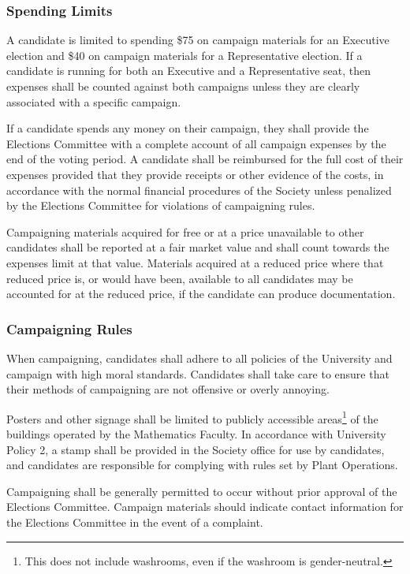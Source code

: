 \subsubsection{Spending Limits}
A candidate is limited to spending \$75 on campaign materials for an Executive election and \$40 on campaign materials for a Representative election.
If a candidate is running for both an Executive and a Representative seat, then expenses shall be counted against both campaigns unless they are clearly associated with a specific campaign.

If a candidate spends any money on their campaign, they shall provide the Elections Committee with a complete account of all campaign expenses by the end of the voting period.
A candidate shall be reimbursed for the full cost of their expenses provided that they provide receipts or other evidence of the costs, in accordance with the normal financial procedures of the Society unless penalized by the Elections Committee for violations of campaigning rules.

Campaigning materials acquired for free or at a price unavailable to other candidates shall be reported at a fair market value and shall count towards the expenses limit at that value.
Materials acquired at a reduced price where that reduced price is, or would have been, available to all candidates may be accounted for at the reduced price, if the candidate can produce documentation.

\subsubsection{Campaigning Rules}
When campaigning, candidates shall adhere to all policies of the University and campaign with high moral standards.
Candidates shall take care to ensure that their methods of campaigning are not offensive or overly annoying.

Posters and other signage shall be limited to publicly accessible areas\footnote{This does not include washrooms, even if the washroom is gender-neutral.} of the buildings operated by the Mathematics Faculty.
In accordance with University Policy 2, a stamp shall be provided in the Society office for use by candidates, and candidates are responsible for complying with rules set by Plant Operations.

Campaigning shall be generally permitted to occur without prior approval of the Elections Committee.
Campaign materials should indicate contact information for the Elections Committee in the event of a complaint.

